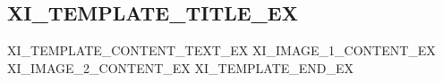 \subsection{XI_TEMPLATE_TITLE_EX}
XI_TEMPLATE_CONTENT_TEXT_EX
\newline
XI_IMAGE_1_CONTENT_EX
XI_IMAGE_2_CONTENT_EX
\newpage
XI_TEMPLATE_END_EX
